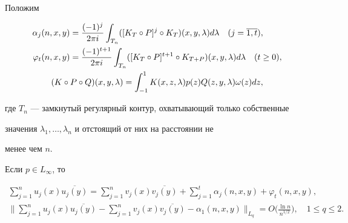 \begin{thm} Положим


\begin{gather}


\begin{align}


\alpha_j(n,x,y)&=\frac{(-1)^j}{2\pi i}


\int_{T_n}([K_T\circ P]^j\circ K_T)(x,y,\lambda)d\lambda\quad


(j=\overline{1,t}), \\


%


\varphi_t(n,x,y)&=\frac{(-1)^{t+1}}{2\pi i}


\int_{T_n}([K_T\circ P]^{t+1}\circ K_{T+P})(x,y,\lambda)d\lambda


\quad (t\ge0),\notag


\end{align}


\\


(K\circ P\circ Q)(x,y,\lambda)=


\int_{-1}^1 K(x,z,\lambda)p(z)Q(z,y,\lambda)\omega(z)dz,\notag


\end{gather}


где $T_n$ --- замкнутый регулярный контур, охватывающий только собственные


значения $\lambda_1,\dotsc,\lambda_n$ и отстоящий от них на расстоянии не


менее чем $n$.





Если $p\in L_\infty$, то


\begin{gather}


\sum_{j=1}^n u_j(x)\overline{u_j(y)}=


\sum_{j=1}^n v_j(x)\overline{v_j(y)} +


\sum_{j=1}^t\alpha_j(n,x,y)+\varphi_t(n,x,y), \\


%


\bigg\|


\sum_{j=1}^n u_j(x)\overline{u_j(y)}-\sum_{j=1}^n v_j(x)


\overline{v_j(y)}-\alpha_1(n,x,y)


\bigg\|_{L_q}=O\bigg(\frac{\ln n}{n^{1/2}}\bigg), \quad 1\le q\le2.


\end{gather}


\end{thm}





